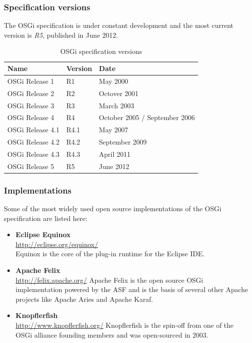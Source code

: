 \subsubsection{Specification versions}
The \gls{OSGi} specification is under constant development and the most current version is \textit{R5}, published in June 2012.

\begin{table}[H]
\centering
\begin{tabular*}{\textwidth}{ l l l }
	\toprule
	Name & Version & Date \\
	\midrule
	OSGi Release 1 & R1 & May 2000 \\
	OSGi Release 2 & R2 & Octover 2001 \\
	OSGi Release 3 & R3 & March 2003 \\
	OSGi Release 4 & R4 & October 2005 / September 2006 \\
	OSGi Release 4.1 & R4.1 & May 2007 \\
	OSGi Release 4.2 & R4.2 & September 2009 \\
	OSGi Release 4.3 & R4.3 & April 2011 \\
	OSGi Release 5 & R5 & June 2012 \\
	\bottomrule
\end{tabular*}
\caption{OSGi specification versions}
\end{table}

\subsubsection{Implementations}
Some of the most widely used open source implementations of the \gls{OSGi} specification are listed here: 

\begin{itemize}
	\item \textbf{Eclipse Equinox} \\
		\url{http://eclipse.org/equinox/} \\
		Equinox is the core of the plug-in runtime for the Eclipse IDE.
	\item \textbf{Apache Felix} \\
		\url{http://felix.apache.org/}
		Apache Felix is the open source \gls{OSGi} implementation powered by the \gls{ASF} and is the basis of several other Apache projects like Apache Aries and Apache Karaf.
	\item \textbf{Knopflerfish} \\
		\url{http://www.knopflerfish.org/}
		Knopflerfish is the spin-off from one of the \gls{OSGi} alliance founding members and was open-sourced in 2003.
\end{itemize}
